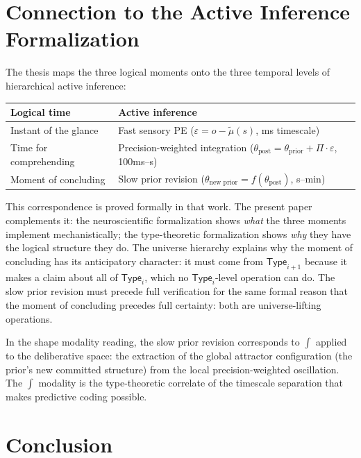 \documentclass[12pt]{article}
\theoremstyle{definition}
\theoremstyle{remark}
\newcommand{\Type}[1]{\mathsf{Type}_{#1}}
\newcommand{\shapemod}{\int}                    %
\begin{document}
\section{Connection to the Active Inference Formalization}

The thesis \cite{papathanasiou2026b} maps the three logical moments onto the three temporal levels of hierarchical active inference:

\begin{center}
\begin{tabular}{ll}
\toprule
\textbf{Logical time} & \textbf{Active inference} \\
\midrule
Instant of the glance & Fast sensory PE ($\varepsilon = o - \tilde{\mu}(s)$, ms timescale) \\
Time for comprehending & Precision-weighted integration ($\theta_{\text{post}} = \theta_{\text{prior}} + \Pi \cdot \varepsilon$, 100ms--s) \\
Moment of concluding & Slow prior revision ($\theta_{\text{new prior}} = f(\theta_{\text{post}})$, s--min) \\
\bottomrule
\end{tabular}
\end{center}

This correspondence is proved formally in that work. The present paper complements it: the neuroscientific formalization shows \emph{what} the three moments implement mechanistically; the type-theoretic formalization shows \emph{why} they have the logical structure they do. The universe hierarchy explains why the moment of concluding has its anticipatory character: it must come from $\Type{i+1}$ because it makes a claim about all of $\Type{i}$, which no $\Type{i}$-level operation can do. The slow prior revision must precede full verification for the same formal reason that the moment of concluding precedes full certainty: both are universe-lifting operations.

In the shape modality reading, the slow prior revision corresponds to $\shapemod$ applied to the deliberative space: the extraction of the global attractor configuration (the prior's new committed structure) from the local precision-weighted oscillation. The $\shapemod$ modality is the type-theoretic correlate of the timescale separation that makes predictive coding possible.

\section{Conclusion}
\end{document}
